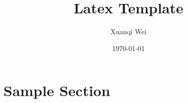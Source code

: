 \documentclass[12pt]{article}
\title{Latex Template}
\author{Xuanqi Wei}
\date{\today}
\begin{document}
\maketitle
\thispagestyle{empty}

\newpage

\tableofcontents
\thispagestyle{empty}

\newpage

\setcounter{page}{1}

\section{Sample Section}
\end{document}
